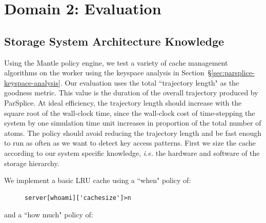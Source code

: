 %
%
%
%
\section{Domain 2: Evaluation}
\subsection{Storage System Architecture Knowledge}
\label{sec:arch-specific}

Using the Mantle policy engine, we test a variety of cache management 
algorithms on the worker using the keyspace analysis in
Section~\S\ref{sec:parsplice-keyspace-analysis}.  Our evaluation uses the total
``trajectory length" as the goodness metric. This value is the duration of the
overall trajectory produced by ParSplice. At ideal efficiency, the trajectory
length should increase with the square root of the wall-clock time, since the
wall-clock cost of time-stepping the system by one simulation time unit
increases in proportion of the total number of atoms.  The policy should avoid
reducing the trajectory length and be fast enough to run as often as we want to
detect key access patterns.  First we size the cache according to our system
specific knowledge, {\it i.e.} the hardware and software of the storage
hierarchy.

We implement a basic LRU cache using a ``when" policy of:

\begin{figure}[h]
\footnotesize
\begin{verbatim}
server[whoami]['cachesize']>n
\end{verbatim}
\end{figure}

and a ``how much" policy of:

